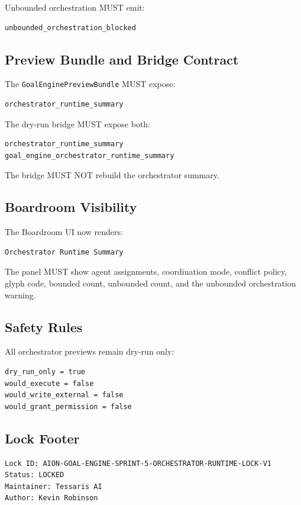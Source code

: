 Unbounded orchestration MUST emit:

\begin{verbatim}
unbounded_orchestration_blocked
\end{verbatim}

\subsection{Preview Bundle and Bridge Contract}

The \texttt{GoalEnginePreviewBundle} MUST expose:

\begin{verbatim}
orchestrator_runtime_summary
\end{verbatim}

The dry-run bridge MUST expose both:

\begin{verbatim}
orchestrator_runtime_summary
goal_engine_orchestrator_runtime_summary
\end{verbatim}

The bridge MUST NOT rebuild the orchestrator summary.

\subsection{Boardroom Visibility}

The Boardroom UI now renders:

\begin{verbatim}
Orchestrator Runtime Summary
\end{verbatim}

The panel MUST show agent assignments, coordination mode, conflict policy, glyph code, bounded count, unbounded count, and the unbounded orchestration warning.

\subsection{Safety Rules}

All orchestrator previews remain dry-run only:

\begin{verbatim}
dry_run_only = true
would_execute = false
would_write_external = false
would_grant_permission = false
\end{verbatim}

\subsection{Lock Footer}

\begin{verbatim}
Lock ID: AION-GOAL-ENGINE-SPRINT-5-ORCHESTRATOR-RUNTIME-LOCK-V1
Status: LOCKED
Maintainer: Tessaris AI
Author: Kevin Robinson
\end{verbatim}
